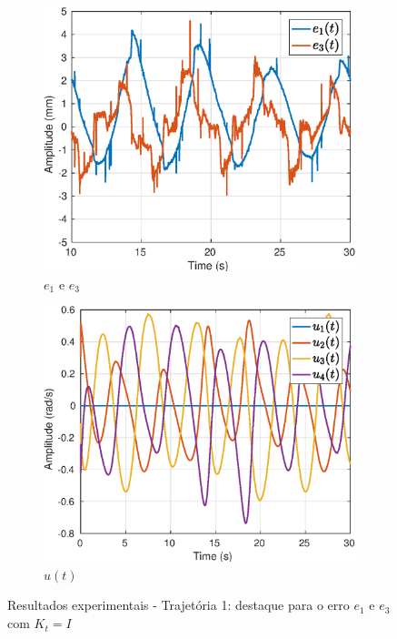 \begin{figure}[H]
\centering
\begin{subfigure}{.5\textwidth}
  \centering
  \includegraphics[width=\linewidth]{./img/traj_1_k1/error.eps}
  \caption{$e_1$ e $e_3$}
  \label{fig:sub1}
\end{subfigure}%
\begin{subfigure}{.5\textwidth}
  \centering
  \includegraphics[width=\linewidth]{./img/traj_1_k1/u.eps}
  \caption{$
  {u}(t)$}
  \label{fig:sub2}
\end{subfigure}
\caption{Resultados experimentais - Trajetória 1: destaque para o erro $e_1$ e $e_3$ com ${K}_t = {I}$}
\label{fig:erro_traj}
\end{figure}

